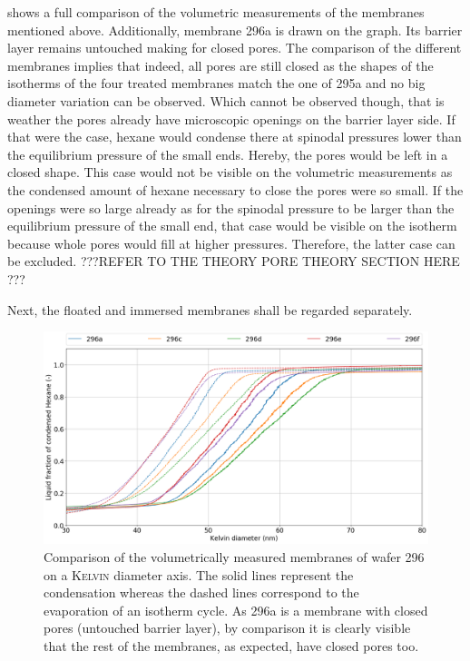 \documentclass[thesis.tex]{subfiles}
\begin{document}
         shows a full comparison of the volumetric measurements of the membranes mentioned above. Additionally, membrane 296a is drawn on the graph. Its barrier layer remains untouched making for closed pores. The comparison of the different membranes implies that indeed, all pores are still closed as the shapes of the isotherms of the four treated membranes match the one of 295a and no big diameter variation can be observed. Which cannot be observed though, that is weather the pores already have microscopic openings on the barrier layer side. If that were the case, hexane would condense there at spinodal pressures lower than the equilibrium pressure of the small ends. Hereby, the pores would be left in a closed shape. This case would not be visible on the volumetric measurements as the condensed amount of hexane necessary to close the pores were so small. If the openings were so large already as for the spinodal pressure to be larger than the equilibrium pressure of the small end, that case would be visible on the isotherm because whole pores would fill at higher pressures. Therefore, the latter case can be excluded.
        ???REFER TO THE THEORY PORE THEORY SECTION HERE ???

        Next, the floated and immersed membranes shall be regarded separately.

        \begin{figure}[ht]
            \centering
            \includegraphics[width=\textwidth]{images/296a_vs_296c_vs_296d_vs_296e_vs_296f_d_kelvin.png}
            \caption{Comparison of the volumetrically measured membranes of wafer 296 on a \textsc{Kelvin} diameter axis. The solid lines represent the condensation whereas the dashed lines correspond to the evaporation of an isotherm cycle. As 296a is a membrane with closed pores (untouched barrier layer), by comparison it is clearly visible that the rest of the membranes, as expected, have closed pores too.}
            \label{fig:full-comp-w296}
        \end{figure}
\end{document}
